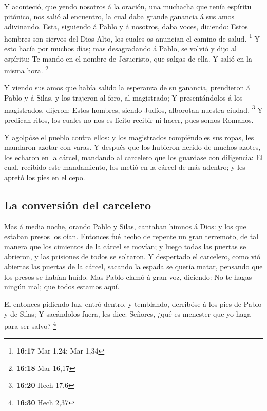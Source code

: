  Y aconteció, que yendo nosotros á la oración, una
muchacha que tenía espíritu pitónico, nos salió al encuentro, la cual
daba grande ganancia á sus amos adivinando.  Esta,
siguiendo á Pablo y á nosotros, daba voces, diciendo: Estos hombres son
siervos del Dios Alto, los cuales os anuncian el camino de salud.
\footnote{\textbf{16:17} Mar 1,24; Mar 1,34}  Y esto
hacía por muchos días; mas desagradando á Pablo, se volvió y dijo al
espíritu: Te mando en el nombre de Jesucristo, que salgas de ella. Y
salió en la misma hora. \footnote{\textbf{16:18} Mar 16,17}

 Y viendo sus amos que había salido la esperanza de su
ganancia, prendieron á Pablo y á Silas, y los trajeron al foro, al
magistrado;  Y presentándolos á los magistrados, dijeron:
Estos hombres, siendo Judíos, alborotan nuestra ciudad, \footnote{\textbf{16:20}
  Hech 17,6}  Y predican ritos, los cuales no nos es
lícito recibir ni hacer, pues somos Romanos.

 Y agolpóse el pueblo contra ellos: y los magistrados
rompiéndoles sus ropas, les mandaron azotar con varas.  Y
después que los hubieron herido de muchos azotes, los echaron en la
cárcel, mandando al carcelero que los guardase con diligencia:
 El cual, recibido este mandamiento, los metió en la
cárcel de más adentro; y les apretó los pies en el cepo.

\hypertarget{la-conversiuxf3n-del-carcelero}{%
\subsection{La conversión del
carcelero}\label{la-conversiuxf3n-del-carcelero}}

 Mas á media noche, orando Pablo y Silas, cantaban himnos
á Dios: y los que estaban presos los oían.  Entonces fué
hecho de repente un gran terremoto, de tal manera que los cimientos de
la cárcel se movían; y luego todas las puertas se abrieron, y las
prisiones de todos se soltaron.  Y despertado el
carcelero, como vió abiertas las puertas de la cárcel, sacando la espada
se quería matar, pensando que los presos se habían huído.
 Mas Pablo clamó á gran voz, diciendo: No te hagas ningún
mal; que todos estamos aquí.

 El entonces pidiendo luz, entró dentro, y temblando,
derribóse á los pies de Pablo y de Silas;  Y sacándolos
fuera, les dice: Señores, ¿qué es menester que yo haga para ser salvo?
\footnote{\textbf{16:30} Hech 2,37}


